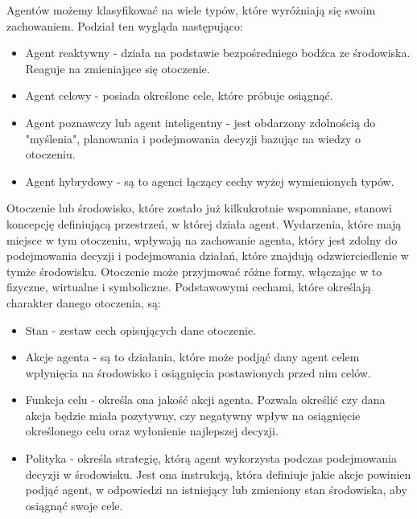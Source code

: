 \par Agentów możemy klasyfikować na wiele typów, które wyróżniają się swoim zachowaniem. Podział ten wygląda następująco:
\begin{itemize}
    \item Agent reaktywny - działa na podstawie bezpośredniego bodźca ze środowiska. Reaguje na zmieniające się otoczenie.\cite{1087032}
    \item Agent celowy - posiada określone cele, które próbuje osiągnąć.\cite{Wooldridge1995IntelligentAT}
    \item Agent poznawczy lub agent inteligentny - jest obdarzony zdolnością do "myślenia", planowania i podejmowania decyzji bazując na wiedzy o otoczeniu. %
    \item Agent hybrydowy - są to agenci łączący cechy wyżej wymienionych typów.
\end{itemize}

\par Otoczenie lub środowisko, które zostało już kilkukrotnie wspomniane, stanowi koncepcję definiującą przestrzeń, w której działa agent. Wydarzenia, które mają miejsce w tym otoczeniu, wpływają na zachowanie agenta, który jest zdolny do podejmowania decyzji i podejmowania działań, które znajdują odzwierciedlenie w tymże środowisku. Otoczenie może przyjmować różne formy, włączając w to fizyczne, wirtualne i symboliczne. Podstawowymi cechami, które określają charakter danego otoczenia, są:
\begin{itemize}
    \item Stan - zestaw cech opisujących dane otoczenie.
    \item Akcje agenta - są to działania, które może podjąć dany agent celem wpłynięcia na środowisko i osiągnięcia postawionych przed nim celów.
    \item Funkcja celu - określa ona jakość akcji agenta. Pozwala określić czy dana akcja będzie miała pozytywny, czy negatywny wpływ na osiągnięcie określonego celu oraz wyłonienie najlepszej decyzji.
    \item Polityka - określa strategię, którą agent wykorzysta podczas podejmowania decyzji w środowisku. Jest ona instrukcją, która definiuje jakie akcje powinien podjąć agent, w odpowiedzi na istniejący lub zmieniony stan środowiska, aby osiągnąć swoje cele.
\end{itemize}